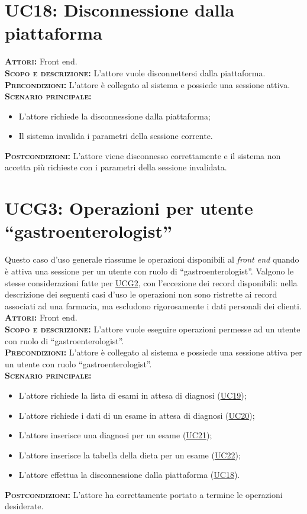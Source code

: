 \section{UC18: Disconnessione dalla piattaforma}
\label{sec:UC18}
\textsc{\textbf{Attori:}} Front end.\\
\textsc{\textbf{Scopo e descrizione:}} L'attore vuole disconnettersi dalla piattaforma.\\
\textsc{\textsc{\textbf{Precondizioni:}}} L'attore è collegato al sistema e possiede una sessione attiva.\\
\textsc{\textbf{Scenario principale:}}
\begin{itemize}
    \item L'attore richiede la disconnessione dalla piattaforma;
    \item Il sistema invalida i parametri della sessione corrente.
\end{itemize}
\textsc{\textbf{Postcondizioni:}} L'attore viene disconnesso correttamente e il sistema non accetta più richieste con i parametri della sessione invalidata.

\section{UCG3: Operazioni per utente ``gastroenterologist''}
\label{sec:UCG3}
Questo caso d'uso generale riassume le operazioni disponibili al \textit{front end} quando è attiva una sessione per un utente con ruolo di ``gastroenterologist''. Valgono le stesse considerazioni fatte per \hyperref[sec:UCG2]{UCG2}, con l'eccezione dei record disponibili: nella descrizione dei seguenti casi d'uso le operazioni non sono ristrette ai record associati ad una farmacia, ma escludono rigorosamente i dati personali dei clienti.\\
\textsc{\textbf{Attori:}} Front end.\\
\textsc{\textbf{Scopo e descrizione:}} L'attore vuole eseguire operazioni permesse ad un utente con ruolo di ``gastroenterologist''.\\
\textsc{\textbf{Precondizioni:}} L'attore è collegato al sistema e possiede una sessione attiva per un utente con ruolo ``gastroenterologist''.\\
\textsc{\textbf{Scenario principale:}} 
\begin{itemize}
    \item L'attore richiede la lista di esami in attesa di diagnosi (\hyperref[sec:UC19]{UC19});
    \item L'attore richiede i dati di un esame in attesa di diagnosi (\hyperref[sec:UC20]{UC20});
    \item L'attore inserisce una diagnosi per un esame (\hyperref[sec:UC21]{UC21});
    \item L'attore inserisce la tabella della dieta per un esame (\hyperref[sec:UC22]{UC22});
    \item L'attore effettua la disconnessione dalla piattaforma (\hyperref[sec:UC18]{UC18}).
\end{itemize}
\textsc{\textbf{Postcondizioni:}} L'attore ha correttamente portato a termine le operazioni desiderate.

